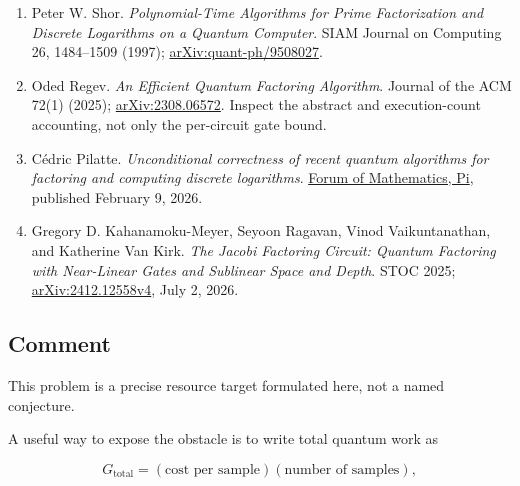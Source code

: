 \begin{enumerate}[label={},leftmargin=4.8em,labelsep=0.5em]
  \footnotesize
  \item[\textup{[Shor97]}]\label{ref:15f8-shor97}
  Peter W. Shor. \emph{Polynomial-Time Algorithms for Prime Factorization and Discrete Logarithms on a Quantum Computer}. SIAM Journal on Computing 26, 1484–1509 (1997); \href{https://arxiv.org/abs/quant-ph/9508027}{arXiv:quant-ph/9508027}.

  \item[\textup{[Regev25]}]\label{ref:15f8-regev25}
  Oded Regev. \emph{An Efficient Quantum Factoring Algorithm}. Journal of the ACM 72(1) (2025); \href{https://arxiv.org/abs/2308.06572}{arXiv:2308.06572}. Inspect the abstract and execution-count accounting, not only the per-circuit gate bound.

  \item[\textup{[Pilatte26]}]\label{ref:15f8-pilatte26}
  Cédric Pilatte. \emph{Unconditional correctness of recent quantum algorithms for factoring and computing discrete logarithms}. \href{https://www.cambridge.org/core/journals/forum-of-mathematics-pi/article/unconditional-correctness-of-recent-quantum-algorithms-for-factoring-and-computing-discrete-logarithms/3077F5BD48D1F62000B1ED800EB86308}{Forum of Mathematics, Pi}, published February 9, 2026.

  \item[\textup{[KahanamokuMeyer25]}]\label{ref:15f8-kahanamokumeyer25}
  Gregory D. Kahanamoku-Meyer, Seyoon Ragavan, Vinod Vaikuntanathan, and Katherine Van Kirk. \emph{The Jacobi Factoring Circuit: Quantum Factoring with Near-Linear Gates and Sublinear Space and Depth}. STOC 2025; \href{https://arxiv.org/abs/2412.12558v4}{arXiv:2412.12558v4}, July 2, 2026.
\end{enumerate}

\subsection*{Comment}

This problem is a precise resource target formulated here, not a named conjecture.

A useful way to expose the obstacle is to write total quantum work as

\begin{equation}
G_{\mathrm{total}}=(\text{cost per sample})(\text{number of samples}),
\label{eq:15f8-2}
\end{equation}


